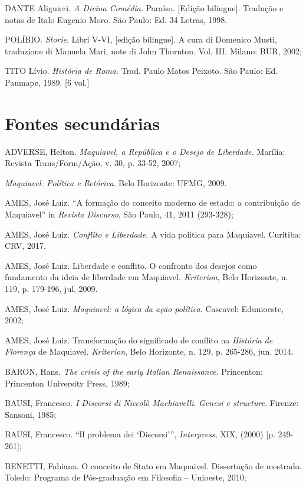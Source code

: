 DANTE Aliguieri. \emph{A Divina Comédia.} Paraíso. {[}Edição
bilingue{]}. Tradução e notas de Italo Eugenio Moro. São Paulo: Ed. 34
Letras, 1998.

POLÍBIO. \emph{Storie}. Libri V-VI, {[}edição bilingue{]}. A cura di
Domenico Musti, traduzione di Manuela Mari, note di John Thornton. Vol.
III. Milano: BUR, 2002;

TITO Lívio. \emph{História de Roma.} Trad. Paulo Matos Peixoto. São
Paulo: Ed. Paumape, 1989. {[}6 vol.{]}

\section{Fontes secundárias}

ADVERSE, Helton. \emph{Maquiavel, a República e o Desejo de Liberdade.}
Marília: Revista Trans/Form/Ação, v. 30, p. 33-52, 2007;

\emph{Maquiavel. Política e Retórica}. Belo Horizonte: UFMG, 2009.

AMES, José Luiz. ``A formação do conceito moderno de estado: a
contribuição de Maquiavel'' in \emph{Revista Discurso}, São Paulo, 41,
2011 (293-328);

AMES, José Luiz. \emph{Conflito e Liberdade.} A vida política para
Maquiavel. Curitiba: CRV, 2017.

AMES, José Luiz. Liberdade e conflito. O confronto dos desejos como
fundamento da ideia de liberdade em Maquiavel\emph{. Kriterion}, Belo
Horizonte, n. 119, p. 179-196, jul. 2009.

AMES, José Luiz. \emph{Maquiavel: a lógica da ação política.} Cascavel:
Edunioeste, 2002;

AMES, José Luiz. Transformação do significado de conflito na
\emph{História de Florença} de Maquiavel\emph{. Kriterion}, Belo
Horizonte, n. 129, p. 265-286, jun. 2014.

BARON, Hans. \emph{The crisis of the early Italian Renaissance}.
Princenton: Princenton University Press, 1989;

BAUSI, Francesco. \emph{I Discorsi di Niccolò Machiavelli}. \emph{Genesi
e structure}. Firenze: Sansoni, 1985;

BAUSI, Francesco. ``Il problema dei `Discorsi''', \emph{Interpress},
XIX, (2000) {[}p. 249-261{]};

BENETTI, Fabiana. O conceito de Stato em Maquaivel. Dissertação de
mestrado. Toledo: Programa de Pós-graduação em Filosofia -- Unioeste,
2010;

